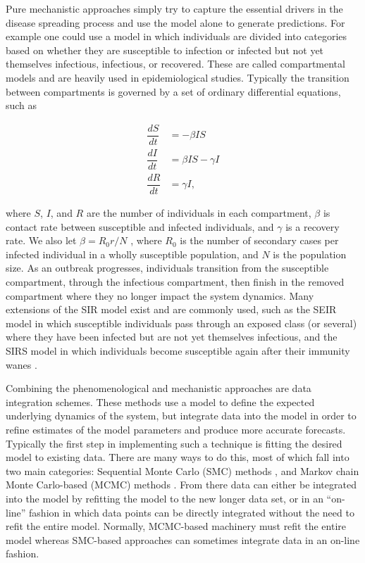 Pure mechanistic approaches simply try to capture the essential drivers in the disease spreading process and use the model alone to generate predictions. For example one could use a model in which individuals are divided into categories based on whether they are susceptible to infection or infected but not yet themselves infectious, infectious, or recovered. These are called compartmental models and are heavily used in epidemiological studies. Typically the transition between compartments is governed by a set of ordinary differential equations, such as 

\begin{equation}\label{sirode}
    \begin{array}{rl}
        \dfrac{dS}{dt} & = - \beta I S \\
        \dfrac{dI}{dt} & = \beta I S - \gamma I  \\
        \dfrac{dR}{dt} & = \gamma I,
    \end{array}
\end{equation}

where $S$, $I$, and $R$ are the number of individuals in each compartment, $\beta$ is contact rate between susceptible and infected individuals, and $\gamma$ is a recovery rate. We also let $\beta = R_0 r / N$ , where $R_0$ is the number of secondary cases per infected individual in a wholly susceptible population, and $N$ is the population size. As an outbreak progresses, individuals transition from the susceptible compartment, through the infectious compartment, then finish in the removed compartment where they no longer impact the system dynamics. Many extensions of the SIR model exist and are commonly used, such as the SEIR model in which susceptible individuals pass through an exposed class (or several) where they have been infected but are not yet themselves infectious, and the SIRS model in which individuals become susceptible again after their immunity wanes \cite{Camacho2011}.

Combining the phenomenological and mechanistic approaches are data integration schemes. These methods use a model to define the expected underlying dynamics of the system, but integrate data into the model in order to refine estimates of the model parameters and produce more accurate forecasts. Typically the first step in implementing such a technique is fitting the desired model to existing data. There are many ways to do this, most of which fall into two main categories: Sequential Monte Carlo (SMC) methods \cite{Arulampalam2002}\cite{Sau1918}\cite{Yang2014}, and Markov chain Monte Carlo-based (MCMC) methods \cite{Andrieu2003}\cite{Neal2011}. From there data can either be integrated into the model by refitting the model to the new longer data set, or in an ``on-line'' fashion in which data points can be directly integrated without the need to refit the entire model. Normally, MCMC-based machinery must refit the entire model whereas SMC-based approaches can sometimes integrate data in an on-line fashion.

